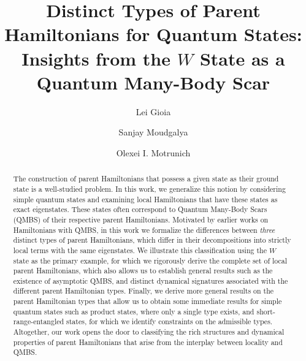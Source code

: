 \documentclass[prx,letterpaper,aps,superscriptaddress,floatfix,twocolumn,nofootinbib]{revtex4-2}
\theoremstyle{definition}
\begin{document}
\title{Distinct Types of Parent Hamiltonians for Quantum States:\\ Insights from the $W$ State as a Quantum Many-Body Scar}
%
\author{Lei Gioia}
%
\author{Sanjay Moudgalya}
%
\author{Olexei I.  Motrunich}
\begin{abstract}
%
The construction of parent Hamiltonians that possess a given state as their ground state is a well-studied problem.
In this work, we generalize this notion by considering simple quantum states and examining local Hamiltonians that have these states as exact eigenstates.
These states often correspond to Quantum Many-Body Scars (QMBS) of their respective parent Hamiltonians.
%
Motivated by earlier works on Hamiltonians with QMBS, in this work we formalize the differences between \textit{three} distinct types of parent Hamiltonians, which differ in their decompositions into strictly local terms with the same eigenstates.
%
We illustrate this classification using the $W$ state as the primary example, for which we rigorously derive the complete set of local parent Hamiltonians, which also allows us to establish general results such as the existence of asymptotic QMBS, and distinct dynamical signatures associated with the different parent Hamiltonian types.
%
Finally, we derive more general results on the parent Hamiltonian types that allow us to obtain some immediate results for simple quantum states such as product states, where only a single type exists, and short-range-entangled states, for which we identify constraints on the admissible types.
%
Altogether, our work opens the door to classifying the rich structures and dynamical properties of parent Hamiltonians that arise from the interplay between locality and QMBS.
\end{abstract}

\maketitle
\tableofcontents
%
%
\end{document}
